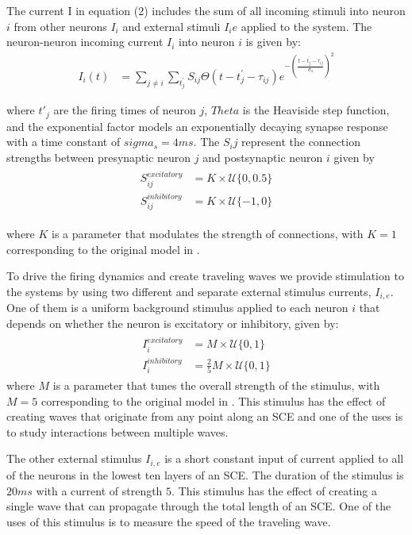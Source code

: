 \documentclass[a4paper,11pt]{article}
\begin{document}
The current I in equation (2) includes the sum of all incoming stimuli into neuron $i$ from other neurons $I_i$ and external stimuli $I_ie$ applied to the system. 
The neuron-neuron incoming current $I_i$ into neuron $i$ is given by:
\begin{align}
 I_i(t) &= \sum_{j\ne i} \sum_{t^\prime_j} S_{ij}  \Theta(t-t^\prime_j-\tau_{ij})e^{-(\frac{t-t^\prime_j-\tau_{ij}}{\sigma_s})^2}
\end{align}

where $t'_j$ are the firing times of neuron $j$, $Theta$ is the Heaviside step function, and the exponential factor models an exponentially decaying synapse response with a time constant of $sigma_s = 4 ms$. 
The $S_ij$ represent the connection strengths between presynaptic neuron $j$ and postsynaptic neuron $i$ given by
\begin{align}
 \begin{split}
  S_{ij}^{excitatory} &= K \times \mathcal{U}\{0,0.5 \} \\
  S_{ij}^{inhibitory} &= K \times \mathcal{U}\{-1,0 \} 
 \end{split}
\end{align}

where $K$ is a parameter that modulates the strength of connections, with $K=1$ corresponding to the original model in \cite{izhikevich2003}.

To drive the firing dynamics and create traveling waves we provide stimulation to the systems by using two different and separate external stimulus currents, $I_{i,e}$. 
One of them is a uniform background stimulus applied to each neuron $i$ that depends on whether the neuron is excitatory or inhibitory, given by:
\begin{align}\label{eq:randomstim}
 \begin{split}
  I_i^{excitatory} &= M \times \mathcal{U}\{0,1 \} \\
  I_i^{inhibitory} &= \frac{2}{5} M \times \mathcal{U}\{0,1 \}
 \end{split}
\end{align}
where $M$ is a parameter that tunes the overall strength of the stimulus, with $M=5$ corresponding to the original model in \cite{izhikevich2003}. 
This stimulus has the effect of creating waves that originate from any point along an SCE and one of the uses is to study interactions between multiple waves.

The other external stimulus $I_{i,e}$ is a short constant input of current applied to all of the neurons in the lowest ten layers of an SCE. 
The duration of the stimulus is $20 ms$ with a current of strength $5$. 
This stimulus has the effect of creating a single wave that can propagate through the total length of an SCE.
One of the uses of this stimulus is to measure the speed of the traveling wave.
\end{document}
